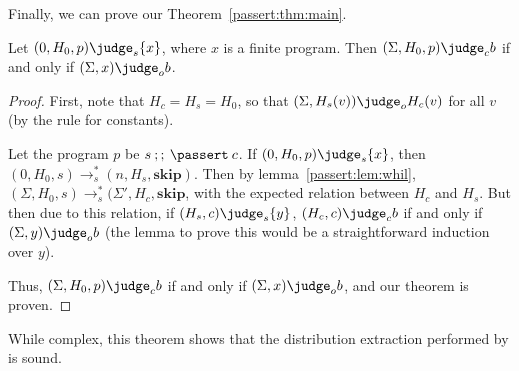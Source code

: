 Finally, we can prove our Theorem~\ref{passert:thm:main}.

\begin{theorem}
Let $(0, H_0, p) \judge_s \{ x \}$, where $x$ is a finite program.
Then $(\Sigma, H_0, p) \judge_c b$ if and only if $(\Sigma, x) \judge_o b$.
\end{theorem}

\begin{proof}
  First, note that $H_c = H_s = H_0$, so that
  $(\Sigma, H_s(v)) \judge_o H_c(v)$ for all $v$
  (by the rule for constants).

  Let the program $p$ be $s\:;;\:\passert\:c$.
  If $(0, H_0, p) \judge_s \{ x \}$, then
  $(0, H_0, s) \to_s^{*} (n, H_s, \mathbf{skip})$.
  Then by lemma~\ref{passert:lem:whil},
  $(\Sigma, H_0, s) \to_s^{*} (\Sigma', H_c, \mathbf{skip}$,
  with the expected relation between $H_c$ and $H_s$.
  But then due to this relation,
  if $(H_s, c) \judge_s \{ y \}$,
  $(H_c, c) \judge_c b$ if and only if $(\Sigma, y) \judge_o b$
  (the lemma to prove this would be a straightforward induction over $y$).

  Thus, $(\Sigma, H_0, p) \judge_c b$ if
  and only if $(\Sigma, x) \judge_o b$,
  and our theorem is proven.
\end{proof}

While complex, this theorem shows that the distribution extraction
performed by \tool is sound.
